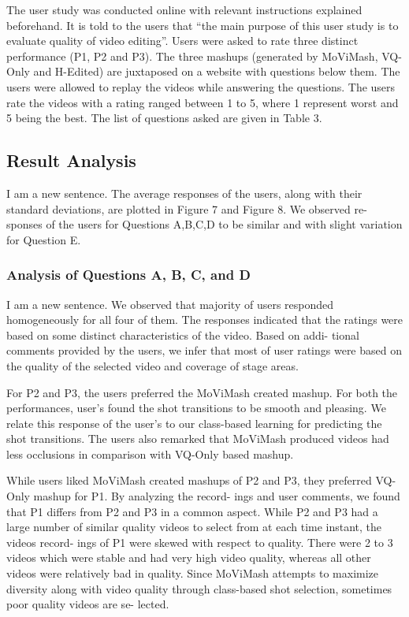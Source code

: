 \documentclass{sig-alternate}
\begin{document}
The user study was conducted online with relevant instructions
explained beforehand. It is told to the users that “the main purpose
of this user study is to evaluate quality of video editing”. Users
were asked to rate three distinct performance (P1, P2 and P3). The
three mashups (generated by MoViMash, VQ-Only and H-Edited)
are juxtaposed on a website with questions below them. The users
were allowed to replay the videos while answering the questions.
The users rate the videos with a rating ranged between 1 to 5, where
1 represent worst and 5 being the best. The list of questions asked
are given in Table 3.

\subsection{Result Analysis}
I am a new sentence.
The average responses of the users, along with their standard
deviations, are plotted in Figure 7 and Figure 8. We observed re-
sponses of the users for Questions A,B,C,D to be similar and with
slight variation for Question E.

\subsubsection{Analysis of Questions A, B, C, and D}
I am a new sentence.
We observed that majority of users responded homogeneously
for all four of them. The responses indicated that the ratings were
based on some distinct characteristics of the video. Based on addi-
tional comments provided by the users, we infer that most of user
ratings were based on the quality of the selected video and coverage
of stage areas.

For P2 and P3, the users preferred the MoViMash created mashup.
For both the performances, user’s found the shot transitions to be
smooth and pleasing. We relate this response of the user’s to our
class-based learning for predicting the shot transitions. The users
also remarked that MoViMash produced videos had less occlusions
in comparison with VQ-Only based mashup.

While users liked MoViMash created mashups of P2 and P3,
they preferred VQ-Only mashup for P1. By analyzing the record-
ings and user comments, we found that P1 differs from P2 and P3 in
a common aspect. While P2 and P3 had a large number of similar
quality videos to select from at each time instant, the videos record-
ings of P1 were skewed with respect to quality. There were 2 to 3
videos which were stable and had very high video quality, whereas
all other videos were relatively bad in quality. Since MoViMash
attempts to maximize diversity along with video quality through
class-based shot selection, sometimes poor quality videos are se-
lected.
\end{document}
